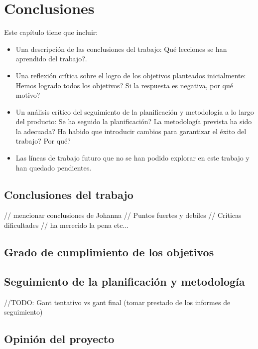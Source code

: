 \documentclass[11pt,a4paper]{article}
\begin{document}
\begin{itemize}
\end{itemize}

\newpage 


\section{Conclusiones}
\bigskip 

Este capítulo tiene que incluir:
\begin{itemize}
\item Una descripción de las conclusiones del trabajo: Qué lecciones se han aprendido del trabajo?.
\item Una reflexión crítica sobre el logro de los objetivos planteados inicialmente: Hemos logrado todos los objetivos? Si la respuesta es negativa, por qué motivo? 
\item Un análisis crítico del seguimiento de la planificación y metodología a lo largo del producto: Se ha seguido la planificación? La metodología prevista ha sido la adecuada? Ha habido que introducir cambios para garantizar el éxito del trabajo? Por qué? 
\item Las líneas de trabajo futuro que no se han podido explorar en este trabajo y han quedado pendientes.
\end{itemize}

\subsection{Conclusiones del trabajo}
// mencionar conclusiones de Johanna
// Puntos fuertes y debiles
// Criticas dificultades
// ha merecido la pena etc...
\medskip 

\subsection{Grado de cumplimiento de los objetivos}
\medskip 

\subsection{Seguimiento de la planificación y metodología}\label{sec:seguiminetoPlanificacion}
//TODO: Gant tentativo vs gant final (tomar prestado de los informes de seguimiento)
\medskip 

\subsection{Opinión del proyecto}
\newpage 
\end{document}
